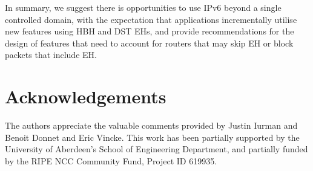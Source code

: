 \documentclass[conference]{IEEEtran}
\begin{document}
In summary, we suggest there is opportunities to use IPv6 beyond a single controlled domain, with the
expectation that applications incrementally utilise new features using HBH and DST EHs, and provide recommendations for the design of  features that need to account for routers that may skip EH or block packets that include EH.

\section*{Acknowledgements}

The authors appreciate the valuable comments provided by Justin Iurman and Benoit Donnet and Eric Vincke. This work has been partially supported by the University of Aberdeen's School of Engineering Department, and partially funded by the RIPE
NCC Community Fund, Project ID 619935.


\small

\end{document}
